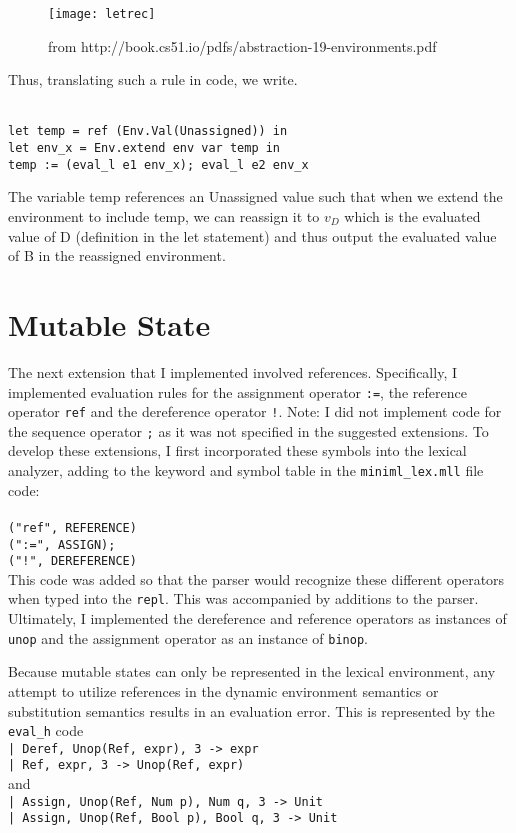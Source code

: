 \documentclass{article}
\def\code#1{\texttt{#1}}
\begin{document}
\begin{figure}
\caption{from http://book.cs51.io/pdfs/abstraction-19-environments.pdf}
\centering
\texttt{[image: letrec]}
\end{figure}

Thus, translating such a rule in code, we write. 

\code{
\\ let temp = ref (Env.Val(Unassigned)) in 
\\ let env\_x = Env.extend env var temp in 
\\ temp := (eval\_l e1 env\_x); eval\_l e2 env\_x }


The variable temp references an Unassigned value such that when we extend the environment to include temp, we can reassign it to $v_{D}$ which is the evaluated value of D (definition in the let statement) and thus output the evaluated value of B in the reassigned environment.

\section{Mutable State}
The next extension that I implemented involved references. Specifically, I implemented evaluation rules for the assignment operator \code{:=}, the reference operator \code{ref} and the dereference operator \code{!}. Note: I did not implement code for the sequence operator \code{;} as it was not specified in the suggested extensions. To develop these extensions, I first incorporated these symbols into the lexical analyzer, adding to the keyword and symbol table in the \code{miniml\_lex.mll} file code:
\\
\\ \code{("ref", REFERENCE)} 
\\ \code{(":=", ASSIGN);
\\("!", DEREFERENCE)} 
\\

 This code was added so that the parser would recognize these different operators when typed into the \code{repl}. This was accompanied by additions to the parser. Ultimately, I implemented the dereference and reference operators as instances of \code{unop} and the assignment operator as an instance of \code{binop}. 
 
 Because mutable states can only be represented in the lexical environment, any attempt to utilize references in the dynamic environment semantics or substitution semantics results in an evaluation error. This is represented by the \code{eval\_h} code 
 \\ \code{| Deref, Unop(Ref, expr), 3 -> expr
 \\ | Ref, expr, 3 -> Unop(Ref, expr)}
 \\ and 
 \\ \code{| Assign, Unop(Ref, Num p), Num q, 3 -> Unit
\\ | Assign, Unop(Ref, Bool p), Bool q, 3 -> Unit} \\
\end{document}
